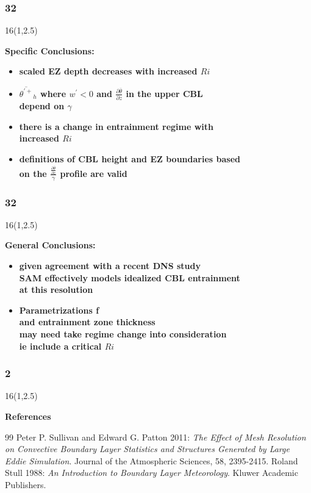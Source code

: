 \documentclass{beamer}
\newcommand\FrameText[1]{
\begin{textblock}{16}(1,2.5)
\raggedright #1
\end{textblock}}
\begin{document}
\begin{frame}
\frametitle{32}
\FrameText{\bf{\large Specific Conclusions:}
\vspace{3mm}
\begin{itemize}
\item \bf{\large scaled EZ depth decreases with increased $Ri$}
\vspace{3mm}
\item \bf{\large $\overline{\theta^{'+}}_{h}$ where $w^{'}<0$ and $\frac{\partial \overline{\theta}}{\partial z}$ in the upper CBL\\
depend on $\gamma$}
\vspace{3mm}
\item \bf{\large there is a change in entrainment regime with\\
increased $Ri$}
\vspace{3mm}
\item \bf{\large definitions of CBL height and EZ boundaries based\\
on the $\frac{\frac{\partial \overline{\theta}}{\partial z}}{\gamma}$ profile are valid}
\end{itemize}
}
\end{frame}

\begin{frame}
\frametitle{32}
\FrameText{
\bf{\large General Conclusions:}
\vspace{3mm}
\begin{itemize}
\item \bf{\large given agreement with a recent DNS study\\ 
SAM effectively models idealized CBL entrainment\\
at this resolution}
\vspace{3mm}

\item \bf{\large Parametrizations f\\
and entrainment zone thickness\\
may need take regime change into consideration\\
ie include a critical $Ri$}
\end{itemize}
}

\end{frame}

\begin{frame}
\frametitle{2}
\FrameText{\bf{\large References}}
\begin{thebibliography}{99}
 Peter P. Sullivan and Edward G. Patton 2011: \emph{The Effect of Mesh Resolution on Convective Boundary Layer Statistics and Structures Generated by Large Eddie Simulation}. Journal of the Atmospheric Sciences, 58, 2395-2415.
 Roland Stull 1988: \emph{An Introduction to Boundary Layer Meteorology}. Kluwer Academic Publishers.
\end{thebibliography}
\end{frame}
\end{document}
